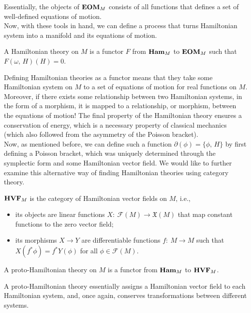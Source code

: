 \documentclass{article}
\newcommand{\category}[1]{{\normalfont\textbf{#1}}}
\begin{document}
\begin{multicols}{2}
\begin{equation}
	\end{equation}
	Essentially, the objects of \(\category{EOM}_M\) consists of all functions that defines a set of well-defined equations of motion.\\
	Now, with these tools in hand, we can define a process that turns Hamiltonian system into a manifold and its equations of motion.
	\begin{definition}
		A Hamiltonian theory on \(M\) is a functor \(F\) from \(\category{Ham}_M\) to \(\category{EOM}_M\) such that \(F(\omega,\,H)(H) = 0\).
	\end{definition}
	Defining Hamiltonian theories as a functor means that they take some Hamiltonian system on \(M\) to a set of equations of motion for real functions on \(M\). 
	Moreover, if there exists some relationship between two Hamiltonian systems, in the form of a morphism, it is mapped to a relationship, or morphism, between the equations of motion!
	The final property of the Hamiltonian theory ensures a conservation of energy, which is a necessary property of classical mechanics (which also followed from the asymmetry of the Poisson bracket).\\
	Now, as mentioned before, we can define such a function \(\partial(\phi) = \{\phi,\,H\}\) by first defining a Poisson bracket, which was uniquely determined through the symplectic form and some Hamiltonian vector field. We would like to further examine this alternative way of finding Hamiltonian theories using category theory.
	\begin{definition}
		\(\category{HVF}_M\) is the category of Hamiltonian vector fields on \(M\), i.e.,
		\begin{itemize}
			\item its objects are linear functions \(X:\ \mathcal{F}(M)\to \mathfrak{X}(M)\) that map constant functions to the zero vector field;
			\item its morphisms \(X\to Y\) are differentiable functions \(f:\ M\to M\) such that \(X(f^*\phi) = f^*Y(\phi)\) for all \(\phi\in\mathcal{F}(M)\).
		\end{itemize}
	\end{definition}
	\begin{definition}
		A proto-Hamiltonian theory on \(M\) is a functor from \(\category{Ham}_M\) to \(\category{HVF}_M\).
	\end{definition}
	A proto-Hamiltonian theory essentially assigns a Hamiltonian vector field to each Hamiltonian system, and, once again, conserves transformations between different systems.\\

\end{multicols}
\end{document}
